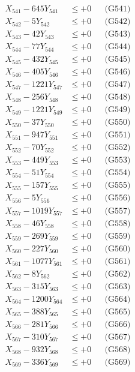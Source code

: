 \documentclass[a4paper,10pt]{article}
\begin{document}
{\begin{align}
\allowbreak
X_{541} - 645Y_{541} &\leq +0 && \text{(G541)} \\
X_{542} - 5Y_{542} &\leq +0 && \text{(G542)} \\
X_{543} - 42Y_{543} &\leq +0 && \text{(G543)} \\
X_{544} - 77Y_{544} &\leq +0 && \text{(G544)} \\
X_{545} - 432Y_{545} &\leq +0 && \text{(G545)} \\
X_{546} - 405Y_{546} &\leq +0 && \text{(G546)} \\
X_{547} - 1221Y_{547} &\leq +0 && \text{(G547)} \\
X_{548} - 256Y_{548} &\leq +0 && \text{(G548)} \\
X_{549} - 1221Y_{549} &\leq +0 && \text{(G549)} \\
X_{550} - 37Y_{550} &\leq +0 && \text{(G550)} \\
\allowbreak
X_{551} - 947Y_{551} &\leq +0 && \text{(G551)} \\
X_{552} - 70Y_{552} &\leq +0 && \text{(G552)} \\
X_{553} - 449Y_{553} &\leq +0 && \text{(G553)} \\
X_{554} - 51Y_{554} &\leq +0 && \text{(G554)} \\
X_{555} - 157Y_{555} &\leq +0 && \text{(G555)} \\
X_{556} - 5Y_{556} &\leq +0 && \text{(G556)} \\
X_{557} - 1019Y_{557} &\leq +0 && \text{(G557)} \\
X_{558} - 46Y_{558} &\leq +0 && \text{(G558)} \\
X_{559} - 269Y_{559} &\leq +0 && \text{(G559)} \\
X_{560} - 227Y_{560} &\leq +0 && \text{(G560)} \\
\allowbreak
X_{561} - 1077Y_{561} &\leq +0 && \text{(G561)} \\
X_{562} - 8Y_{562} &\leq +0 && \text{(G562)} \\
X_{563} - 315Y_{563} &\leq +0 && \text{(G563)} \\
X_{564} - 1200Y_{564} &\leq +0 && \text{(G564)} \\
X_{565} - 388Y_{565} &\leq +0 && \text{(G565)} \\
X_{566} - 281Y_{566} &\leq +0 && \text{(G566)} \\
X_{567} - 310Y_{567} &\leq +0 && \text{(G567)} \\
X_{568} - 932Y_{568} &\leq +0 && \text{(G568)} \\
X_{569} - 336Y_{569} &\leq +0 && \text{(G569)} \\

\end{align}}
\end{document}
